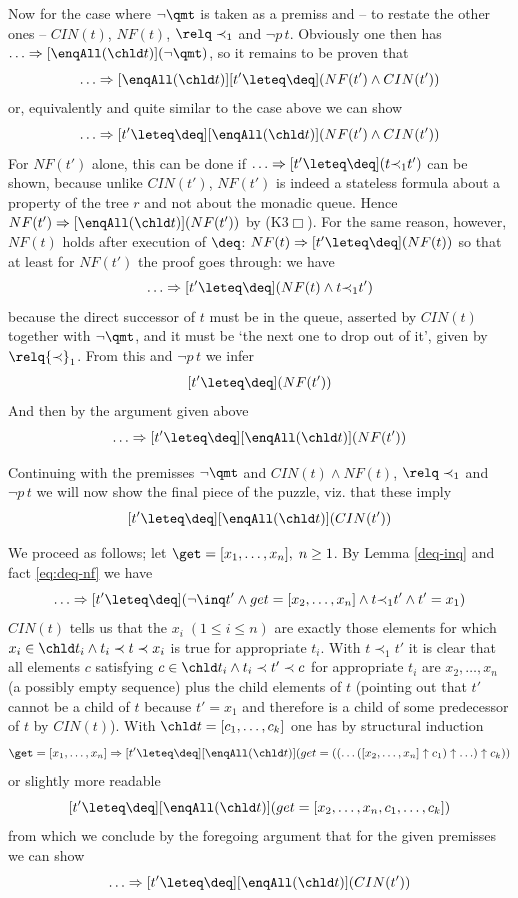 Now for the case where $\lnot \qmt$ is taken as a premiss and -- to restate the
other ones -- $CIN(t)$, $NF(t)$, $\relq \prec_1$ and $\lnot p\,t$. Obviously one then has
$\ldots \Rightarrow [\enqAll (\chld t)](\lnot \qmt)$, so it remains to be proven that
\[
\ldots \Rightarrow [\enqAll (\chld t)][t' \leteq \deq](NF(t') \land CIN(t'))
\]
or, equivalently and quite similar to the case above we can show
\[
\ldots \Rightarrow [t' \leteq \deq][\enqAll (\chld t)](NF(t') \land CIN(t'))
\]
For $NF(t')$ alone, this can be done if $\ldots \Rightarrow [t' \leteq \deq](t {\prec}_1 t')$ can be shown,
because unlike $CIN(t')$, $NF(t')$ is indeed a stateless formula about a
property of the tree $r$ and not about the monadic queue. Hence $NF(t') \Rightarrow
[\enqAll (\chld t)](NF(t'))$ by (K3$\Box$). For
the same reason, however, $NF(t)$ holds after execution of $\deq$: $NF(t) \Rightarrow [t'
\leteq \deq](NF(t))$ so that at least for $NF(t')$ the proof goes through: we have
\begin{equation}
\label{eq:deq-nf}
\ldots \Rightarrow [t' \leteq \deq](NF(t) \land t {\prec}_1 t')
\end{equation}
because the direct successor of $t$ must be in the queue, asserted by $CIN(t)$
together with $\lnot\qmt$, and it must be `the next one to drop out of it', given
by $\relq {\prec}_1$. From this and $\lnot p\,t$ we infer
\[
[t' \leteq \deq](NF(t'))
\]
And then by the argument given above
\[
\ldots \Rightarrow [t' \leteq \deq][\enqAll (\chld t)](NF(t'))
\]

Continuing with the premisses $\lnot \qmt$ and $CIN(t) \land NF(t)$, $\relq \prec_1$ and $\lnot
p\,t$ we will now show the final piece of the puzzle, viz. that these imply
\begin{equation}
\label{peter}
[t' \leteq \deq][\enqAll (\chld t)](CIN(t'))
\end{equation}

We proceed as follows; let $\get = [x_1,\ldots,x_n],\; n \geq 1$.  By Lemma
\ref{deq-inq} and fact \eqref{eq:deq-nf} we have
\[
\ldots \Rightarrow [t' \leteq \deq](\lnot \inq t' \land get = [x_2,\ldots, x_n] \land t {\prec}_1 t' \land t' = x_1)
\]
$CIN(t)$ tells us that the $x_i\; (1\leq i\leq n)$ are exactly those elements for which
$x_i \in \chld t_i \land t_i \prec t \prec x_i$ is true for appropriate $t_i$. With $t \prec_1 t'$
it is clear that all elements $c$ satisfying $c \in \chld t_i \land t_i \prec t' \prec c$ for
appropriate $t_i$ are $x_2,\ldots,x_n$ (a possibly empty sequence) plus the child
elements of $t$ (pointing out that $t'$ cannot be a child of $t$ because
$t' = x_1$ and therefore is a child of some predecessor of $t$ by $CIN(t)$). With
$\chld t = [c_1,\ldots,c_k]$ one has by structural induction
\[
\get = [x_1,\ldots,x_n] \Rightarrow [t' \leteq \deq][\enqAll (\chld t)](get = ((\ldots([x_2,\ldots,x_n]\uparrow c_1)\uparrow \ldots ) \uparrow c_k))
\]
or slightly more readable
\[
[t' \leteq \deq][\enqAll (\chld t)](get = [x_2,\ldots,x_n,c_1,\ldots,c_k])
\]
from which we conclude by the foregoing argument that for the given premisses we
can show
\[
\ldots \Rightarrow [t' \leteq \deq][\enqAll (\chld t)](CIN(t'))
\]

